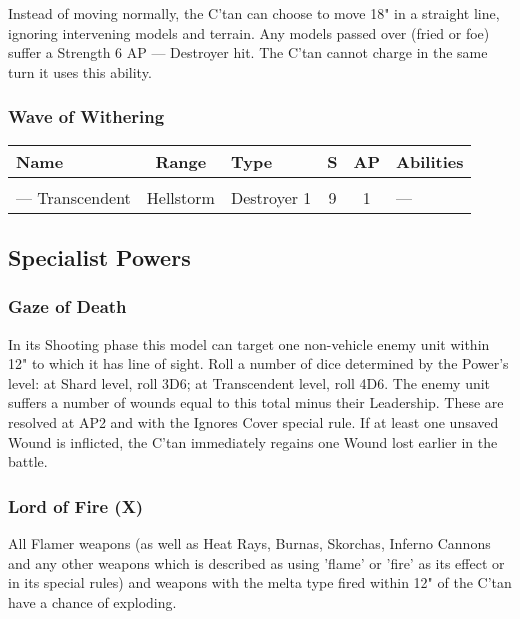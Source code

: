 Instead of moving normally, the C'tan can choose to move 18" in a straight line, ignoring intervening models and terrain. Any models passed over (fried or foe) suffer a Strength 6 AP — Destroyer hit. The C'tan cannot charge in the same turn it uses this ability.

\subsubsection{Wave of Withering} \label{Wave of Withering}

\noindent
\begin{NiceTabular}{L{115 pt} c C{40pt} *{2}{c} >{\raggedright\arraybackslash}p{240pt}}
	Name & Range & Type & S & AP & Abilities \\
	\hline
	 &  &  &  &  & \\
	— Transcendent & Hellstorm & Destroyer 1 & 9 & 1 & — \\
\end{NiceTabular}

\subsection{Specialist Powers}

\subsubsection{Gaze of Death} \label{Gaze of Death}

In its Shooting phase this model can target one non-vehicle enemy unit within 12" to which it has line of sight. Roll a number of dice determined by the Power's level: at Shard level, roll 3D6; at Transcendent level, roll 4D6. The enemy unit suffers a number of wounds equal to this total minus their Leadership. These are resolved at AP2 and with the Ignores Cover special rule. If at least one unsaved Wound is inflicted, the C’tan immediately regains one Wound lost earlier in the battle.

\subsubsection{Lord of Fire (X)} \label{Lord of Fire}

All Flamer weapons (as well as Heat Rays, Burnas, Skorchas, Inferno Cannons and any other weapons which is described as using 'flame' or 'fire' as its effect or in its special rules) and weapons with the melta type fired within 12" of the C'tan have a chance of exploding. 

